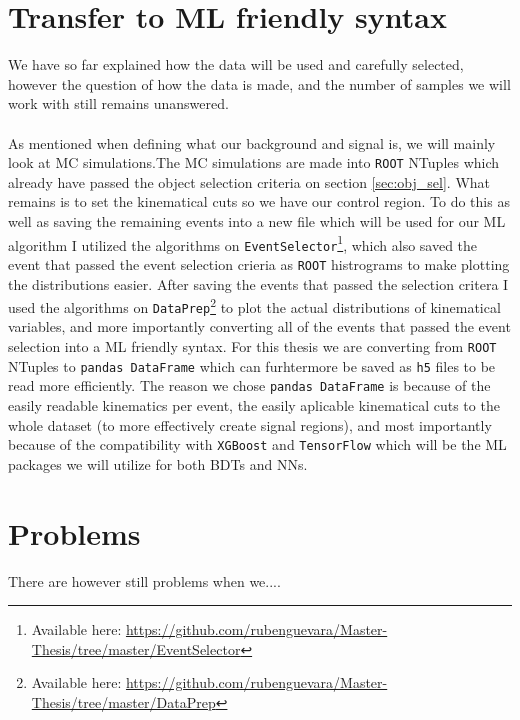 \documentclass[14pt, a4paper]{book}
\begin{document}
\section{Transfer to ML friendly syntax}
We have so far explained how the data will be used and carefully selected, however the question of how the data is made, and the number of samples we will work with still remains unanswered. \\
\\As mentioned when defining what our background and signal is, we will mainly look at MC simulations.The MC simulations are made into \verb|ROOT| \cite{ROOT} NTuples which already have passed the object selection criteria on section \ref{sec:obj_sel}. What remains is to set the kinematical cuts so we have our control region. 
To do this as well as saving the remaining events into a new file which will be used for our ML algorithm I utilized the algorithms on \verb|EventSelector|\footnote{Available here: \href{https://github.com/rubenguevara/Master-Thesis/tree/master/EventSelector}{https://github.com/rubenguevara/Master-Thesis/tree/master/EventSelector}}, 
which also saved the event that passed the event selection crieria as \verb|ROOT| histrograms to make plotting the distributions easier. After saving the events that passed the selection critera I used the algorithms on \verb|DataPrep|\footnote{Available here: \href{https://github.com/rubenguevara/Master-Thesis/tree/master/DataPrep}{https://github.com/rubenguevara/Master-Thesis/tree/master/DataPrep}} 
to plot the actual distributions of kinematical variables, and more importantly converting all of the events that passed the event selection into a ML friendly syntax. For this thesis we are converting from \verb|ROOT| NTuples to \verb|pandas DataFrame| \cite{pd.DataFrame} 
which can furhtermore be saved as \verb|h5| files to be read more efficiently. The reason we chose \verb|pandas DataFrame| is because of the easily readable kinematics per event, the easily aplicable kinematical cuts to the whole dataset 
(to more effectively create signal regions), and most importantly because of the compatibility with \verb|XGBoost| \cite{XGBoost} and \verb|TensorFlow| \cite{TensorFlow} which will be the ML packages we will utilize for both BDTs and NNs.

\section{Problems}
There are however still problems when we....
\end{document}
